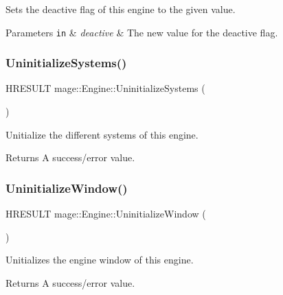 Sets the deactive flag of this engine to the given value.


\begin{DoxyParams}[1]{Parameters}
\mbox{\tt in}  & {\em deactive} & The new value for the deactive flag. \\
\hline
\end{DoxyParams}
\hypertarget{classmage_1_1_engine_ad760164f873e1d15aa8826d532b6d551}{}\label{classmage_1_1_engine_ad760164f873e1d15aa8826d532b6d551} 
\subsubsection{\texorpdfstring{Uninitialize\+Systems()}{UninitializeSystems()}}
{\footnotesize\ttfamily H\+R\+E\+S\+U\+LT mage\+::\+Engine\+::\+Uninitialize\+Systems (\begin{DoxyParamCaption}{ }\end{DoxyParamCaption})\hspace{0.3cm}{\ttfamily [protected]}}

Unitialize the different systems of this engine.

\begin{DoxyReturn}{Returns}
A success/error value. 
\end{DoxyReturn}
\hypertarget{classmage_1_1_engine_a52544e3bdc0e62f5beab19e9c37ec022}{}\label{classmage_1_1_engine_a52544e3bdc0e62f5beab19e9c37ec022} 
\subsubsection{\texorpdfstring{Uninitialize\+Window()}{UninitializeWindow()}}
{\footnotesize\ttfamily H\+R\+E\+S\+U\+LT mage\+::\+Engine\+::\+Uninitialize\+Window (\begin{DoxyParamCaption}{ }\end{DoxyParamCaption})\hspace{0.3cm}{\ttfamily [protected]}}

Unitializes the engine window of this engine.

\begin{DoxyReturn}{Returns}
A success/error value. 
\end{DoxyReturn}


